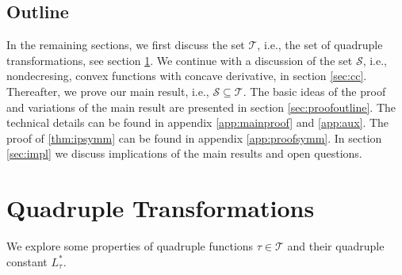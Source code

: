 \documentclass{article}
\renewcommand{\subset}{\subseteq}
\newcommand*{\mc}[1]{\mathcal{#1}}
\newcommand{\tran}{\tau}
\newcommand{\Tran}{\mc{T}}
\newcommand{\ctransymbol}{L}
\newcommand{\ctranobest}[1]{\ctransymbol_{#1}^{*}}
\newcommand{\ctranbest}{\ctranobest{\tran}}
\newcommand{\setcc}{\mc S}
\begin{document}
\subsection{Outline}
%
In the remaining sections, we first discuss the set $\Tran$, i.e., the set of quadruple transformations, see section \ref{sec:quad}. We continue with a discussion of the set $\setcc$, i.e., nondecresing, convex functions with concave derivative, in section \ref{sec:cc}. Thereafter, we prove our main result, i.e., $\setcc \subset \Tran$. The basic ideas of the proof and variations of the main result are presented in section \ref{sec:proofoutline}. The technical details can be found in appendix \ref{app:mainproof} and \ref{app:aux}. The proof of \cref{thm:ipsymm} can be found in appendix \ref{app:proofsymm}. In section \ref{sec:impl} we discuss implications of the main results and open questions.
%
%
\section{Quadruple Transformations}\label{sec:quad}
%
We explore some properties of quadruple functions $\tran \in\Tran$ and their quadruple constant $\ctranbest$.
%
%
%
\end{document}
